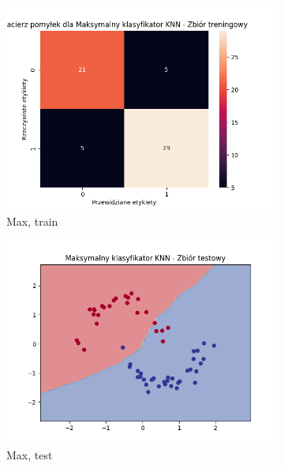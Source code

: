\documentclass[12pt]{article}
\newcommand*{\subfigwidth}{0.24\textwidth}
\begin{document}
\begin{figure}[H]
\begin{subfigure}[t]{\subfigwidth}
        \includegraphics[width=\linewidth]{img/exp_3/knn/2_2/max/train_matrix.png}
        \caption{Max, train}
    \end{subfigure}
    \hfill
    \begin{subfigure}[t]{\subfigwidth}
        \includegraphics[width=\linewidth]{img/exp_3/knn/2_2/max/test_boundary.png}
        \caption{Max, test}
    \end{subfigure}
    \hfill
    \begin{subfigure}[t]{\subfigwidth}

\end{subfigure}
\end{figure}
\end{document}
